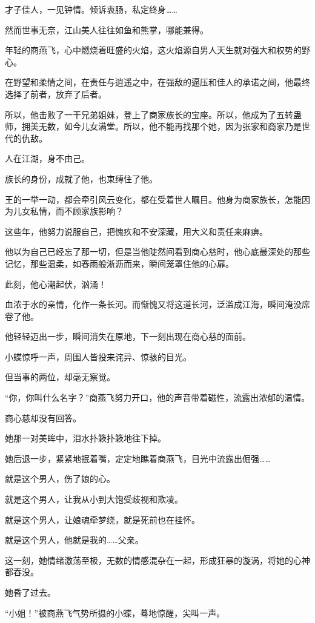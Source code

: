 \begin{this_body}
才子佳人，一见钟情。倾诉衷肠，私定终身……

然而世事无奈，江山美人往往如鱼和熊掌，哪能兼得。

年轻的商燕飞，心中燃烧着旺盛的火焰，这火焰源自男人天生就对强大和权势的野心。

在野望和柔情之间，在责任与逍遥之中，在强敌的逼压和佳人的承诺之间，他最终选择了前者，放弃了后者。

所以，他击败了一干兄弟姐妹，登上了商家族长的宝座。所以，他成为了五转蛊师，拥美无数，如今儿女满堂。所以，他不能再找那个她，因为张家和商家乃是世代的仇敌。

人在江湖，身不由己。

族长的身份，成就了他，也束缚住了他。

王的一举一动，都会牵引风云变化，都在受着世人瞩目。他身为商家族长，怎能因为儿女私情，而不顾家族影响？

这些年，他努力说服自己，把愧疚和不安深藏，用大义和责任来麻痹。

他以为自己已经忘了那一切，但是当他陡然间看到商心慈时，他心底最深处的那些记忆，那些温柔，如春雨般淅沥而来，瞬间笼罩住他的心扉。

此刻，他心潮起伏，汹涌！

血浓于水的亲情，化作一条长河。而惭愧又将这道长河，泛滥成江海，瞬间淹没席卷了他。

他轻轻迈出一步，瞬间消失在原地，下一刻出现在商心慈的面前。

小蝶惊呼一声，周围人皆投来诧异、惊骇的目光。

但当事的两位，却毫无察觉。

“你，你叫什么名字？”商燕飞努力开口，他的声音带着磁性，流露出浓郁的温情。

商心慈却没有回答。

她那一对美眸中，泪水扑簌扑簌地往下掉。

她后退一步，紧紧地抿着嘴，定定地瞧着商燕飞，目光中流露出倔强……

就是这个男人，伤了娘的心。

就是这个男人，让我从小到大饱受歧视和欺凌。

就是这个男人，让娘魂牵梦绕，就是死前也在挂怀。

就是这个男人，他就是我的……父亲。

这一刻，她情绪激荡至极，无数的情感混杂在一起，形成狂暴的漩涡，将她的心神都吞没。

她昏了过去。

“小姐！”被商燕飞气势所摄的小蝶，蓦地惊醒，尖叫一声。


\end{this_body}
